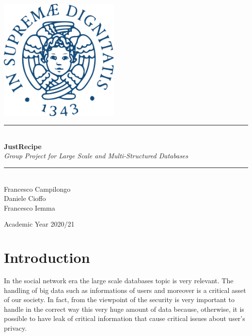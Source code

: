 \documentclass[a4paper]{report}
\newcommand{\HRule}{\rule{\linewidth}{0.5mm}}
\begin{document}
\begin{titlepage}
	\begin{center}
		
		\includegraphics[width=0.45\textwidth]{img/unipi.png}~\\[2.5cm]
		
		
		\HRule \\[0.4cm]
		{ \LARGE 
			\textbf{JustRecipe}\\[0.4cm]
			\emph{Group Project for Large Scale and Multi-Structured Databases}\\[0.4cm]
		}
		\HRule \\[1.5cm]
		
		
		
		{ \large
			Francesco Campilongo \\[0.1cm]
			Daniele Cioffo \\[0.1cm]
			Francesco Iemma \\[0.1cm]
		}
		
		\vfill

		
		
		{\large Academic Year 2020/21}
		
	\end{center}
\end{titlepage}


\tableofcontents

\chapter*{Introduction}
In the social network era the large scale databases topic is very relevant. The handling of big data such as informations of users and moreover is a critical asset of our society. In fact, from the viewpoint of the security is very important to handle in the correct way this very huge amount of data because, otherwise, it is possible to have leak of critical information that cause critical issues about user's privacy.
\end{document}
